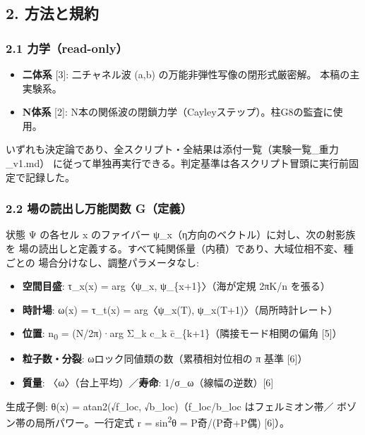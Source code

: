 \documentclass[
]{ltjarticle}
\providecommand{\tightlist}{%
  \setlength{\itemsep}{0pt}\setlength{\parskip}{0pt}}
\begin{document}
\subsection{2. 方法と規約}\label{ux65b9ux6cd5ux3068ux898fux7d04}

\subsubsection{2.1 力学（read-only）}\label{ux529bux5b66read-only}

\begin{itemize}
\tightlist
\item
  \textbf{二体系} {[}3{]}: 二チャネル波 (a,b)
  の万能非弾性写像の閉形式厳密解。 本稿の主実験系。
\item
  \textbf{N体系} {[}2{]}:
  N本の関係波の閉鎖力学（Cayleyステップ）。柱G8の監査に使用。
\end{itemize}

いずれも決定論であり、全スクリプト・全結果は添付一覧（実験一覧\_重力\_v1.md）
に従って単独再実行できる。判定基準は各スクリプト冒頭に実行前固定で記録した。

\subsubsection{2.2 場の読出し万能関数
G（定義）}\label{ux5834ux306eux8aadux51faux3057ux4e07ux80fdux95a2ux6570-gux5b9aux7fa9}

状態 Ψ の各セル x のファイバー
ψ\_x（η方向のベクトル）に対し、次の射影族を
場の読出しと定義する。すべて純関係量（内積）であり、大域位相不変、種ごとの
場合分けなし、調整パラメータなし:

\begin{itemize}
\tightlist
\item
  \textbf{空間目盛}: τ\_x(x) = arg〈ψ\_x, ψ\_\{x+1\}〉（海が定規 2πK/n
  を張る）
\item
  \textbf{時計場}: ω(x) = τ\_t(x) = arg〈ψ\_x(T),
  ψ\_x(T+1)〉（局所時計レート）
\item
  \textbf{位置}: n\textsubscript{0} = (N/2π)·arg Σ\_k c\_k
  c̄\_\{k+1\}（隣接モード相関の偏角 {[}5{]}）
\item
  \textbf{粒子数・分裂}: ωロック同値類の数（累積相対位相の π 基準
  {[}6{]}）
\item
  \textbf{質量}: 〈ω〉（台上平均）／\textbf{寿命}:
  1/σ\_ω（線幅の逆数）{[}6{]}
\end{itemize}

生成子側: θ(x) = atan2(√f\_loc, √b\_loc)（f\_loc/b\_loc
はフェルミオン帯／ ボゾン帯の局所パワー。一行定式 r =
sin\textsuperscript{2}θ = P奇/(P奇+P偶) {[}6{]}）。
\end{document}
